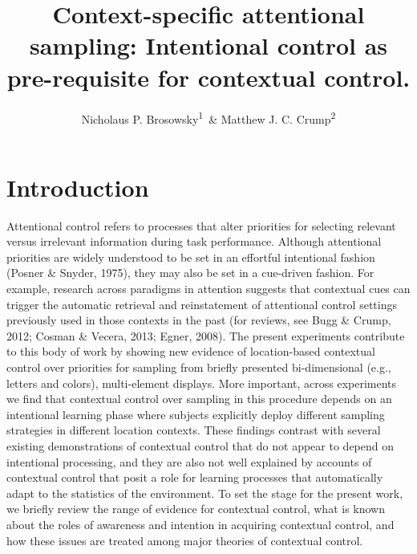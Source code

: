\documentclass[english,,man,floatsintext]{apa6}
\title{Context-specific attentional sampling: Intentional control as
pre-requisite for contextual control.}
\author{Nicholaus P. Brosowsky\textsuperscript{1}~\& Matthew J. C.
Crump\textsuperscript{2}}
\date{}
\affiliation{
\vspace{0.5cm}
\textsuperscript{1} The Graduate Center of the City University of New York\\\textsuperscript{2} Brooklyn College of the City University of New York}
\begin{document}
\maketitle

\section{Introduction}\label{introduction}

Attentional control refers to processes that alter priorities for
selecting relevant versus irrelevant information during task
performance. Although attentional priorities are widely understood to be
set in an effortful intentional fashion (Posner \& Snyder, 1975), they
may also be set in a cue-driven fashion. For example, research across
paradigms in attention suggests that contextual cues can trigger the
automatic retrieval and reinstatement of attentional control settings
previously used in those contexts in the past (for reviews, see Bugg \&
Crump, 2012; Cosman \& Vecera, 2013; Egner, 2008). The present
experiments contribute to this body of work by showing new evidence of
location-based contextual control over priorities for sampling from
briefly presented bi-dimensional (e.g., letters and colors),
multi-element displays. More important, across experiments we find that
contextual control over sampling in this procedure depends on an
intentional learning phase where subjects explicitly deploy different
sampling strategies in different location contexts. These findings
contrast with several existing demonstrations of contextual control that
do not appear to depend on intentional processing, and they are also not
well explained by accounts of contextual control that posit a role for
learning processes that automatically adapt to the statistics of the
environment. To set the stage for the present work, we briefly review
the range of evidence for contextual control, what is known about the
roles of awareness and intention in acquiring contextual control, and
how these issues are treated among major theories of contextual control.
\end{document}

